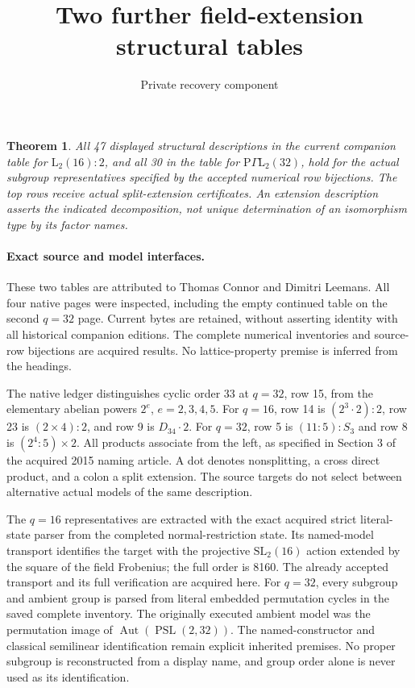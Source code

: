 \documentclass[11pt]{article}
\title{Two further field-extension structural tables}
\author{Private recovery component}\date{}
\newtheorem{theorem}{Theorem}
\begin{document}
\maketitle
\begin{theorem}
All 47 displayed structural descriptions in the current companion table
for $\mathrm L_2(16):2$, and all 30 in the table for
$\mathrm P\Gamma\mathrm L_2(32)$, hold for the actual subgroup
representatives specified by the accepted numerical row bijections.
The top rows receive actual split-extension certificates. An extension
description asserts the indicated decomposition, not unique determination
of an isomorphism type by its factor names.
\end{theorem}

\paragraph{Exact source and model interfaces.}
These two tables are attributed to Thomas Connor and Dimitri Leemans.
All four native pages were inspected, including the empty continued table
on the second $q=32$ page. Current bytes are retained, without asserting
identity with all historical companion editions. The complete numerical
inventories and source-row bijections are acquired results. No
lattice-property premise is inferred from the headings.

The native ledger distinguishes cyclic order 33 at $q=32$, row 15,
from the elementary abelian powers $2^e$, $e=2,3,4,5$.
For $q=16$, row 14 is $(2^3\mathbin{\cdot}2):2$, row 23 is
$(2\times4):2$, and row 9 is $D_{34}\mathbin{\cdot}2$.
For $q=32$, row 5 is $(11:5):S_3$ and row 8 is $(2^4:5)\times2$.
All products associate from the left, as specified in Section 3 of the
acquired 2015 naming article. A dot denotes nonsplitting, a cross direct
product, and a colon a split extension. The source targets do not select
between alternative actual models of the same description.

The $q=16$ representatives are extracted with the exact acquired strict
literal-state parser from the completed normal-restriction state. Its
named-model transport identifies the target with the projective
$\mathrm{SL}_2(16)$ action extended by the square of the field Frobenius;
the full order is 8160. The already accepted transport and its full
verification are acquired here. For $q=32$, every subgroup and ambient
group is parsed from literal embedded permutation cycles in the saved
complete inventory. The originally executed ambient model was the
permutation image of $\operatorname{Aut}(\operatorname{PSL}(2,32))$.
The named-constructor and classical semilinear identification remain
explicit inherited premises. No proper subgroup is reconstructed from a
display name, and group order alone is never used as its identification.
\end{document}

